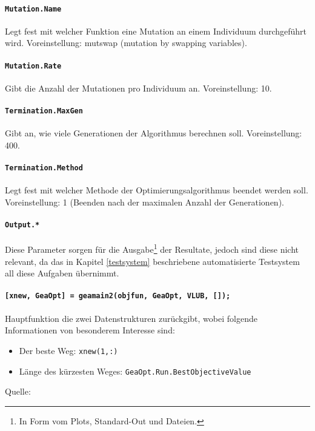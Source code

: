 \paragraph{{\tt Mutation.Name}} Legt fest mit welcher Funktion eine Mutation
an einem Individuum durchgeführt wird.
Voreinstellung: mutswap (mutation by swapping variables).

\paragraph{{\tt Mutation.Rate}} Gibt die Anzahl der Mutationen
pro Individuum an.
Voreinstellung: 10.

\paragraph{{\tt Termination.MaxGen}} Gibt an, wie viele Generationen der
Algorithmus berechnen soll.
Voreinstellung: 400.

\paragraph{{\tt Termination.Method}} Legt fest mit welcher Methode der
Optimierungsalgorithmus beendet werden soll.
Voreinstellung: 1 (Beenden nach der maximalen Anzahl der Generationen).

\paragraph{{\tt Output.*}} Diese Parameter sorgen für die
Ausgabe\footnote{In Form vom Plots, Standard-Out und Dateien.} der Resultate,
jedoch sind diese nicht relevant, da das in Kapitel \ref{testsystem} beschriebene
automatisierte Testsystem all diese Aufgaben übernimmt.

\paragraph{{\tt [xnew, GeaOpt] = geamain2(objfun, GeaOpt, VLUB, []);}}
Hauptfunktion die zwei Datenstrukturen zurückgibt, wobei folgende
Informationen von besonderem Interesse sind:

\begin{itemize}
  \item Der beste Weg: {\tt xnew(1,:)}
  \item Länge des kürzesten Weges: {\tt GeaOpt.Run.BestObjectiveValue}
\end{itemize}

\noindent Quelle: \citep{geatbx-options}

